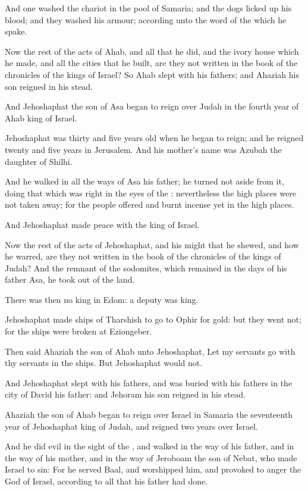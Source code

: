 \Verse And one washed the chariot in the pool of Samaria; and the dogs licked up his blood; and they washed his armour; according unto the word of the \LORD which he spake.

\Verse Now the rest of the acts of Ahab, and all that he did, and the ivory house which he made, and all the cities that he built, are they not written in the book of the chronicles of the kings of Israel?  \Verse So Ahab slept with his fathers; and Ahaziah his son reigned in his stead.

\Verse And Jehoshaphat the son of Asa began to reign over Judah in the fourth year of Ahab king of Israel.

\Verse Jehoshaphat was thirty and five years old when he began to reign; and he reigned twenty and five years in Jerusalem. And his mother's name was Azubah the daughter of Shilhi.

\Verse And he walked in all the ways of Asa his father; he turned not aside from it, doing that which was right in the eyes of the \LORD: nevertheless the high places were not taken away; for the people offered and burnt incense yet in the high places.

\Verse And Jehoshaphat made peace with the king of Israel.

\Verse Now the rest of the acts of Jehoshaphat, and his might that he shewed, and how he warred, are they not written in the book of the chronicles of the kings of Judah?  \Verse And the remnant of the sodomites, which remained in the days of his father Asa, he took out of the land.

\Verse There was then no king in Edom: a deputy was king.

\Verse Jehoshaphat made ships of Tharshish to go to Ophir for gold: but they went not; for the ships were broken at Eziongeber.

\Verse Then said Ahaziah the son of Ahab unto Jehoshaphat, Let my servants go with thy servants in the ships. But Jehoshaphat would not.

\Verse And Jehoshaphat slept with his fathers, and was buried with his fathers in the city of David his father: and Jehoram his son reigned in his stead.

\Verse Ahaziah the son of Ahab began to reign over Israel in Samaria the seventeenth year of Jehoshaphat king of Judah, and reigned two years over Israel.

\Verse And he did evil in the sight of the \LORD, and walked in the way of his father, and in the way of his mother, and in the way of Jeroboam the son of Nebat, who made Israel to sin: \Verse For he served Baal, and worshipped him, and provoked to anger the \LORD God of Israel, according to all that his father had done.

